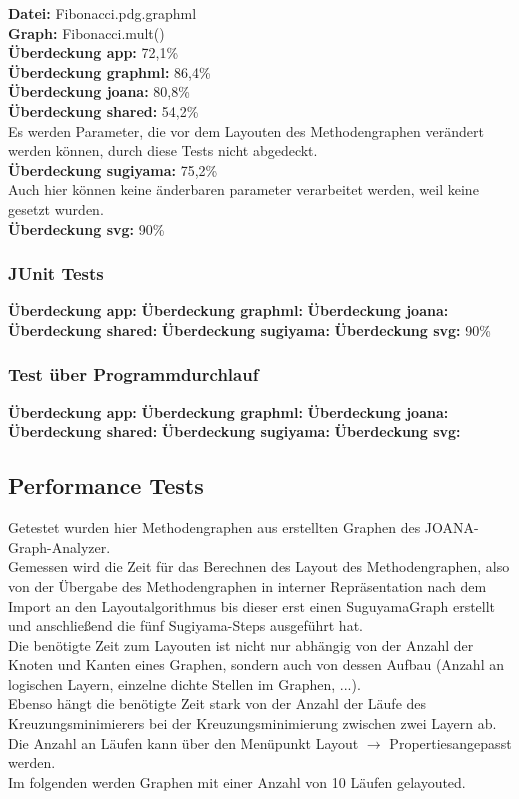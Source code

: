 \textbf{Datei: }Fibonacci.pdg.graphml\\
\textbf{Graph: }Fibonacci.mult()\\
\textbf{Überdeckung app: }72,1\%\\
\textbf{Überdeckung graphml: }86,4\%\\
\textbf{Überdeckung joana: }80,8\%\\
\textbf{Überdeckung shared: }54,2\%\\
Es werden Parameter, die vor dem Layouten des Methodengraphen verändert werden können, durch diese Tests nicht abgedeckt.\\
\textbf{Überdeckung sugiyama: }75,2\%\\
Auch hier können keine änderbaren parameter verarbeitet werden, weil keine gesetzt wurden.\\
\textbf{Überdeckung svg: }90\%\\
\subsubsection{JUnit Tests}

\textbf{Überdeckung app: }
\textbf{Überdeckung graphml: }
\textbf{Überdeckung joana: }
\textbf{Überdeckung shared: }
\textbf{Überdeckung sugiyama: }
\textbf{Überdeckung svg: }90\%\\

\subsubsection{Test über Programmdurchlauf}

\textbf{Überdeckung app: }
\textbf{Überdeckung graphml: }
\textbf{Überdeckung joana: }
\textbf{Überdeckung shared: }
\textbf{Überdeckung sugiyama: }
\textbf{Überdeckung svg: }

\subsection{Performance Tests}
Getestet wurden hier Methodengraphen aus erstellten Graphen des JOANA-Graph-Analyzer.\\
Gemessen wird die Zeit für das Berechnen des Layout des Methodengraphen, also von der Übergabe des Methodengraphen in interner Repräsentation nach dem Import an den Layoutalgorithmus bis dieser erst einen SuguyamaGraph erstellt und anschließend die fünf Sugiyama-Steps ausgeführt hat.\\
Die benötigte Zeit zum Layouten ist nicht nur abhängig von der Anzahl der Knoten und Kanten eines Graphen, sondern auch von dessen Aufbau (Anzahl an logischen Layern, einzelne dichte Stellen im Graphen, ...).\\
Ebenso hängt die benötigte Zeit stark von der Anzahl der Läufe des Kreuzungsminimierers bei der Kreuzungsminimierung zwischen zwei Layern ab. Die Anzahl an Läufen kann über den Menüpunkt \glqq{}Layout $\to$ Properties\grqq angepasst werden.\\
Im folgenden werden Graphen mit einer Anzahl von 10 Läufen gelayouted.\\


